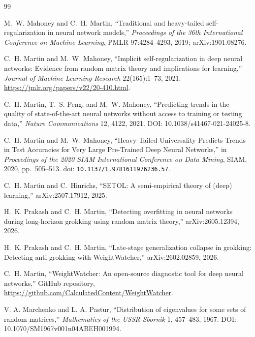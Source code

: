 \documentclass[10pt,twocolumn]{article}
\begin{document}
\begin{thebibliography}{99}
\footnotesize\setlength{\itemsep}{0pt}\setlength{\parskip}{0pt}

M.~W. Mahoney and C.~H. Martin, ``Traditional and heavy-tailed self-regularization in neural network models,'' \emph{Proceedings of the 36th International Conference on Machine Learning}, PMLR 97:4284--4293, 2019; arXiv:1901.08276.

C.~H. Martin and M.~W. Mahoney, ``Implicit self-regularization in deep neural networks: Evidence from random matrix theory and implications for learning,'' \emph{Journal of Machine Learning Research} 22(165):1--73, 2021. \url{https://jmlr.org/papers/v22/20-410.html}.

  C.~H. Martin, T.~S. Peng, and M.~W. Mahoney, ``Predicting trends in the quality of state-of-the-art neural networks without access to training or testing data,'' \emph{Nature Communications} 12, 4122, 2021. DOI: 10.1038/s41467-021-24025-8.

C.~H. Martin and M.~W. Mahoney,
``Heavy-Tailed Universality Predicts Trends in Test Accuracies for Very Large Pre-Trained Deep Neural Networks,''
in \emph{Proceedings of the 2020 SIAM International Conference on Data Mining},
SIAM, 2020, pp.~505--513.
doi: \texttt{10.1137/1.9781611976236.57}.

C.~H. Martin and C.~Hinrichs, ``SETOL: A semi-empirical theory of (deep) learning,'' arXiv:2507.17912, 2025.

H.~K. Prakash and C.~H. Martin, ``Detecting overfitting in neural networks during long-horizon grokking using random matrix theory,'' arXiv:2605.12394, 2026.


H.~K. Prakash and C.~H. Martin, ``Late-stage generalization collapse in grokking: Detecting anti-grokking with WeightWatcher,'' arXiv:2602.02859, 2026.

  C.~H. Martin, ``WeightWatcher: An open-source diagnostic tool for deep neural networks,'' GitHub repository, \url{https://github.com/CalculatedContent/WeightWatcher}.

V. A. Marchenko and L. A. Pastur,
``Distribution of eigenvalues for some sets of random matrices,''
\emph{Mathematics of the USSR-Sbornik} 1, 457--483, 1967. DOI: 10.1070/SM1967v001n04ABEH001994.


\end{thebibliography}
\end{document}

